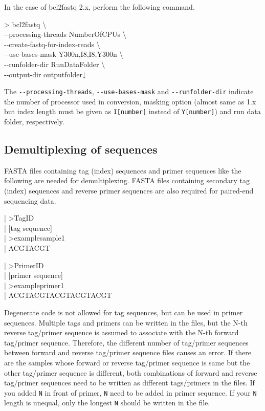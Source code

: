 \documentclass[titlepage,10pt,a4paper,english]{jsbook}
\newenvironment{content}{\begin{shaded}\vspace{-1em}\raggedright\ttfamily\footnotesize\setlength{\baselineskip}{1.4em}}{\end{shaded}\vspace{-1em}}
\newenvironment{cmd}{\begin{oframed}\raggedright\ttfamily\footnotesize\setlength{\baselineskip}{1.4em}}{\end{oframed}\vspace{-1em}}
\begin{document}
In the case of bcl2fastq 2.x, perform the following command.

\begin{cmd}
{\textgreater} bcl2fastq {\textbackslash}\\
{-}{-}processing-threads NumberOfCPUs {\textbackslash}\\
{-}{-}create-fastq-for-index-reads {\textbackslash}\\
{-}{-}use-bases-mask Y300n,I8,I8,Y300n {\textbackslash}\\
{-}{-}runfolder-dir RunDataFolder {\textbackslash}\\
{-}{-}output-dir outputfolder↓
\end{cmd}

The \texttt{{-}{-}processing-threads}, \texttt{{-}{-}use-bases-mask} and \texttt{{-}{-}runfolder-dir} indicate the number of processor used in conversion, masking option (almost same as 1.x but index length must be given as \texttt{I[number]} instead of \texttt{Y[number]}) and run data folder, respectively.

\subsection{Demultiplexing of sequences}

FASTA files containing tag (index) sequences and primer sequences like the following are needed for demultiplexing.
FASTA files containing secondary tag (index) sequences and reverse primer sequences are also required for paired-end sequencing data.

\begin{content}
| {\textgreater}TagID\\
| [tag sequence]\\
| {\textgreater}examplesample1\\
| ACGTACGT
\end{content}

\begin{content}
| {\textgreater}PrimerID\\
| [primer sequence]\\
| {\textgreater}exampleprimer1\\
| ACGTACGTACGTACGTACGT
\end{content}

Degenerate code is not allowed for tag sequences, but can be used in primer sequences.
Multiple tags and primers can be written in the files, but the N-th reverse tag/primer sequence is assumed to associate with the N-th forward tag/primer sequence.
Therefore, the different number of tag/primer sequences between forward and reverse tag/primer sequence files causes an error.
If there are the samples whose forward or reverse tag/primer sequence is same but the other tag/primer sequence is different, both combinations of forward and reverse tag/primer sequences need to be written as different tags/primers in the files.
If you added \texttt{N} in front of primer, \texttt{N} need to be added in primer sequence.
If your \texttt{N} length is unequal, only the longest \texttt{N} should be written in the file.
\end{document}
